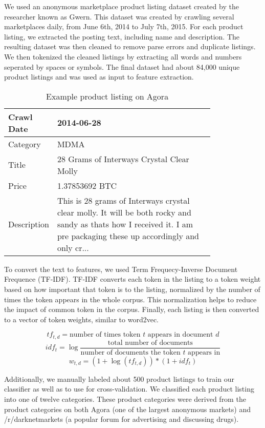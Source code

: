 We used an anonymous marketplace product listing dataset created by the researcher known as
Gwern\cite{gwern-darknet}.
This dataset was created by crawling several marketplaces daily, from June 6th, 2014 to July 7th, 2015.
For each product listing, we extracted the posting text, including name and description.
The resulting dataset was then cleaned to remove parse errors and duplicate listings.
We then tokenized the cleaned listings by extracting all words and numbers seperated by spaces or
symbols.
The final dataset had about 84,000 unique product listings and was used as input to feature extraction.

\begin{table}[!ht]
    \begin{center}
        \begin{tabular}{| l | p{0.8\linewidth} |}
        \hline
        Crawl Date & 2014-06-28 \\
        \hline
        Category & MDMA \\
        \hline
        Title & 28 Grams of Interways Crystal Clear Molly \\
        \hline
        Price & 1.37853692 BTC \\
        \hline
        Description & This is 28 grams of Interways crystal clear molly.
        It will be both rocky and sandy as thats how I received it.
        I am pre packaging these up accordingly and only cr... \\
        \hline
        \end{tabular}
    \end{center}
    \caption{Example product listing on Agora}
\end{table}

To convert the text to features, we used Term Frequecy-Inverse Document Frequence (TF-IDF).
TF-IDF converts each token in the listing to a token weight based on how important that token is to the listing, normalized by the number of times the token appears in the whole corpus.
This normalization helps to reduce the impact of common token in the corpus.
Finally, each listing is then converted to a vector of token weights, similar to word2vec.

$$ {tf}_{t,d} = \text{number of times token } t \text{ appears in document } d $$
$$ {idf}_t = \log \frac{\text{total number of documents}}{\text{number of documents the token } t \text{ appears in}} $$
$$ w_{t,d} = (1 + \log ({tf}_{t,d})) * (1 + {idf}_t) $$

Additionally, we manually labeled about 500 product listings to train our classifier as well as to use for cross-validation.
We classified each product listing into one of twelve categories.
These product categories were derived from the product categories on both Agora\cite{agora} (one of the largest anonymous markets) and /r/darknetmarkets (a popular forum for advertising and discussing drugs).
